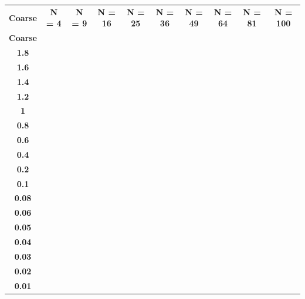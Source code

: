 \noindent\begin{minipage}{\textwidth}
\centering
\begin{tabular}{c c c c c c c c c c }
\textbf{Coarse} &  \textbf{N = 4}	& \textbf{N = 9}	& \textbf{N = 16}	& \textbf{N = 25}	&\textbf{N = 36}&	\textbf{N = 49}	& \textbf{N = 64	}& \textbf{N = 81}	& \textbf{N = 100}  \\
\textbf{Coarse} & 		&		& 	        & 		&          &                   &               &             &                \\
\textbf{1.8	} & 				& 			&         &         &      &          &         &         &          \\
\textbf{1.6	} & 				& 			&         &         &      &          &         &         &          \\
\textbf{1.4	} & 				& 			&         &         &      &          &         &         &          \\
\textbf{1.2	} & 				& 			&         &         &      &          &         &         &          \\
\textbf{1}    & 				& 		  &         &         &      &          &         &         &          \\
\textbf{0.8	} & 				& 			&         &         &      &          &         &         &          \\
\textbf{0.6	} & 				& 			&         &         &      &          &         &         &          \\
\textbf{0.4	} & 				& 			&         &         &      &          &         &         &          \\
\textbf{0.2	} & 				& 			&         &         &      &          &         &         &          \\
\textbf{0.1	} & 				& 			&         &         &      &          &         &         &          \\
\textbf{0.08} & 				& 			& 	      &         &      &          &         &         &          \\
\textbf{0.06} & 				& 			& 	      &         &      &          &         &         &          \\
\textbf{0.05} & 				& 			& 	      &         &      &          &         &         &          \\
\textbf{0.04} & 				& 			& 	      &         &      &          &         &         &          \\
\textbf{0.03} & 				& 			& 	      &         &      &          &         &         &          \\
\textbf{0.02} & 				& 			& 	      &         &      &          &         &         &          \\
\textbf{0.01} & 				& 			& 	      &         &      &          &         &         &          \\
\end{tabular}
\label{study}
\end{minipage}

